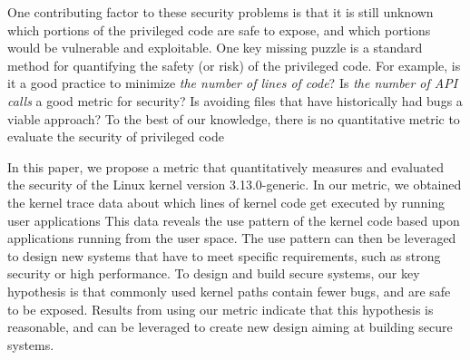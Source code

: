 One contributing factor to these security problems 
is that it is still unknown which portions of the privileged code are
safe to expose, and which portions would be vulnerable and exploitable. 
One key missing puzzle is a standard method for quantifying the safety (or 
risk) of the privileged code. 
For example, is it a good practice to minimize \textit{the number of lines of code}?
Is \textit{the number of API calls} a good metric for security?   
Is avoiding files that have historically had bugs a viable approach?
To the best of our knowledge, there is no quantitative metric  to evaluate the 
security of privileged code  

In this paper, we propose a metric that quantitatively measures and evaluated 
the security of the Linux kernel version 3.13.0-generic.  
In our metric, we obtained the kernel trace data about which lines of kernel code 
get executed by running user applications  
This data reveals the use pattern of the kernel code 
based upon applications running from the user space. The use pattern can then be
leveraged to design new systems that have to meet specific requirements, 
such as strong security or high performance. 
To design and build secure systems, 
our key hypothesis is that commonly used kernel paths contain fewer bugs, and are 
safe to be exposed. 
Results from using our metric indicate that this hypothesis is reasonable, and 
can be leveraged to create new design aiming at building secure systems. 

